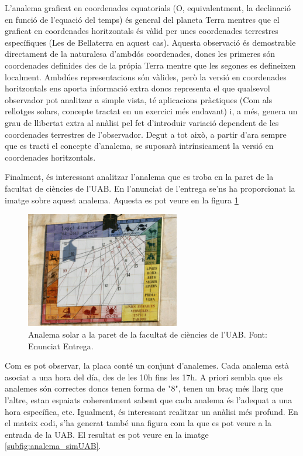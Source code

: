 \documentclass[a4paper, 11pt]{article}
\begin{document}
\vspace{2mm}

\noindent L'analema graficat en coordenades equatorials (O, equivalentment, la declinació en funció de l'equació del temps) és general del planeta Terra mentres que el graficat en coordenades horitzontals és vàlid per unes coordenades terrestres específiques (Les de Bellaterra en aquest cas). Aquesta observació és demostrable directament de la naturalesa d'ambdós coordenades, doncs les primeres són coordenades definides des de la própia Terra mentre que les segones es defineixen localment. Ambdúes representacions són vàlides, però la versió en coordenades horitzontals ens aporta informació extra doncs representa el que qualsevol observador pot analitzar a simple vista, té aplicacions pràctiques (Com als rellotges solars, concepte tractat en un exercici més endavant) i, a més, genera un grau de llibertat extra al anàlisi pel fet d'introduir variació dependent de les coordenades terrestres de l'observador. Degut a tot això, a partir d'ara sempre que es tracti el concepte d'analema, se suposarà intrínsicament la versió en coordenades horitzontals.

\vspace{2mm}

\noindent Finalment, és interessant analitzar l'analema que es troba en la paret de la facultat de ciències de l'UAB. En l'anunciat de l'entrega se'ns ha proporcionat la imatge sobre aquest analema. Aquesta es pot veure en la figura \ref{fig:analema_UAB}

\begin{figure}[h!]
    \centering
    \includegraphics[width=0.6\textwidth]{images/analema_UAB.png}
    \caption{Analema solar a la paret de la facultat de ciències de l'UAB. Font: Enunciat Entrega.}
    \label{fig:analema_UAB}
\end{figure}
\vspace{2mm}

\noindent Com es pot observar, la placa conté un conjunt d'analemes. Cada analema està asociat a una hora del día, des de les 10h fins les 17h. A priori sembla que els analemes són correctes doncs tenen forma de "8", tenen un braç més llarg que l'altre, estan espaiats coherentment sabent que cada analema és l'adequat a una hora específica, etc. Igualment, és interessant realitzar un anàlisi més profund. En el mateix codi, s'ha generat també una figura com la que es pot veure a la entrada de la UAB. El resultat es pot veure en la imatge \ref{subfig:analema_simUAB}.
\end{document}
